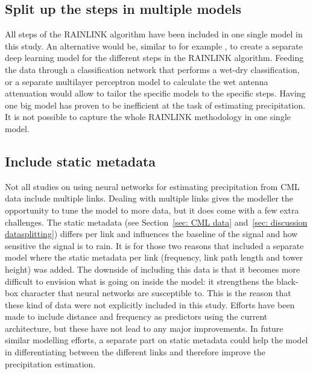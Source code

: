 \documentclass[twocolumn, 10pt, a4paper]{memoir}
\begin{document}
	\subsection*{Split up the steps in multiple models}
	All steps of the RAINLINK algorithm have been included in one single model in this study. An alternative would be, similar to for example , to create a separate deep learning model for the different steps in the RAINLINK algorithm. Feeding the data through a classification network that performs a wet-dry classification, or a separate multilayer perceptron model to calculate the wet antenna attenuation would allow to tailor the specific models to the specific steps. Having one big model has proven to be inefficient at the task of estimating precipitation. It is not possible to capture the whole RAINLINK methodology in one single model.
	
	\subsection*{Include static metadata}
	Not all studies on using neural networks for estimating precipitation from CML data include multiple links. Dealing with multiple links gives the modeller the opportunity to tune the model to more data, but it does come with a few extra challenges. The static metadata (see Section~\ref{sec: CML data} and~\ref{sec: discussion datasplitting}) differs per link and influences the baseline of the signal and how sensitive the signal is to rain. It is for those two reasons that  included a separate model where the static metadata per link (frequency, link path length and tower height) was added. The downside of including this data is that it becomes more difficult to envision what is going on inside the model: it strengthens the black-box character that neural networks are susceptible to. This is the reason that these kind of data were not explicitly included in this study. Efforts have been made to include distance and frequency as predictors using the current architecture, but these have not lead to any major improvements. In future similar modelling efforts, a separate part on static metadata could help the model in differentiating between the different links and therefore improve the precipitation estimation. 
	
\end{document}
